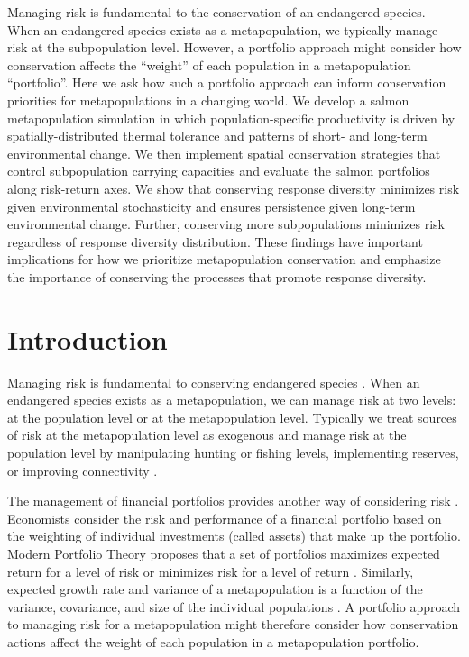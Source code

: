 Managing risk is fundamental to the conservation of an endangered species. When an endangered species exists as a metapopulation, we typically manage risk at the subpopulation level. However, a portfolio approach might consider how conservation affects the ``weight'' of each population in a metapopulation ``portfolio''. Here we ask how such a portfolio approach can inform conservation priorities for metapopulations in a changing world. We develop a salmon metapopulation simulation in which population-specific productivity is driven by spatially-distributed thermal tolerance and patterns of short- and long-term environmental change. We then implement spatial conservation strategies that control subpopulation carrying capacities and evaluate the salmon portfolios along risk-return axes. We show that conserving response diversity minimizes risk given environmental stochasticity and ensures persistence given long-term environmental change. Further, conserving more subpopulations minimizes risk regardless of response diversity distribution. These findings have important implications for how we prioritize metapopulation conservation and emphasize the importance of conserving the processes that promote response diversity.

\section{Introduction}

Managing risk is fundamental to conserving endangered species \citep{burgman2005, iucn2009}. When an endangered species exists as a metapopulation, we can manage risk at two levels: at the population level or at the metapopulation level. Typically we treat sources of risk at the metapopulation level as exogenous and manage risk at the population level by manipulating hunting or fishing levels, implementing reserves, or improving connectivity \citep[e.g.][]{akcakaya2007}.

The management of financial portfolios provides another way of considering risk \citep{figge2004, koellner2006, ando2012}. Economists consider the risk and performance of a financial portfolio based on the weighting of individual investments (called assets) that make up the portfolio. Modern Portfolio Theory proposes that a set of portfolios maximizes expected return for a level of risk or minimizes risk for a level of return \citep{markowitz1952, markowitz1959}. Similarly, expected growth rate and variance of a metapopulation is a function of the variance, covariance, and size of the individual populations \citep{moore2010}. A portfolio approach to managing risk for a metapopulation might therefore consider how conservation actions affect the weight of each population in a metapopulation portfolio.

